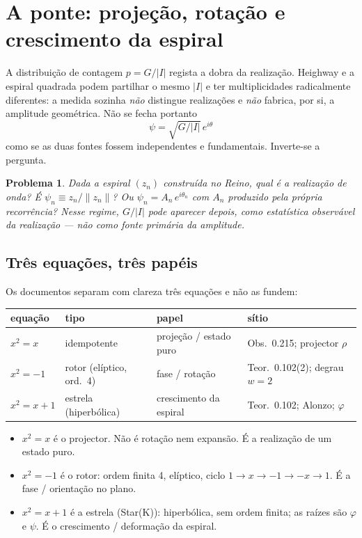 \documentclass[11pt,a4paper]{article}
\newtheorem{problema}[teorema]{Problema}
\begin{document}
\section{A ponte: projeção, rotação e crescimento da espiral}
\label{sec:ponte}

A distribuição de contagem $p=G/|I|$ regista a dobra da realização.
Heighway e a espiral quadrada podem partilhar o mesmo $|I|$ e ter multiplicidades
radicalmente diferentes: a medida sozinha \emph{não} distingue realizações e
\emph{não} fabrica, por si, a amplitude geométrica.
Não se fecha portanto
\[
\psi=\sqrt{G/|I|}\,e^{i\theta}
\]
como se as duas fontes fossem independentes e fundamentais.
Inverte-se a pergunta.

\begin{problema}
\label{prob:central}
Dada a espiral $(z_n)$ construída no Reino, qual é a realização de onda?
É $\psi_n\equiv z_n/\|z_n\|$?
Ou $\psi_n=A_n\,e^{i\theta_n}$ com $A_n$ produzido pela própria recorrência?
Nesse regime, $G/|I|$ pode aparecer \emph{depois}, como estatística observável
da realização --- não como fonte primária da amplitude.
\end{problema}

\subsection{Três equações, três papéis}

Os documentos separam com clareza três equações e não as fundem:

\begin{center}
\renewcommand{\arraystretch}{1.25}
\begin{tabular}{@{}llll@{}}
\toprule
equação & tipo & papel & sítio \\
\midrule
$x^2=x$ & idempotente & projeção / estado puro & Obs.~0.215; projector $\rho$ \\
$x^2=-1$ & rotor (elíptico, ord.~4) & fase / rotação & Teor.~0.102(2); degrau $w=2$ \\
$x^2=x+1$ & estrela (hiperbólica) & crescimento da espiral & Teor.~0.102; Alonzo; $\varphi$ \\
\bottomrule
\end{tabular}
\end{center}

\begin{itemize}[leftmargin=1.3em,itemsep=2pt]
  \item $x^2=x$ é o projector. Não é rotação nem expansão. É a realização de um estado puro.
  \item $x^2=-1$ é o rotor: ordem finita 4, elíptico, ciclo
        $1\to x\to-1\to-x\to1$. É a fase / orientação no plano.
  \item $x^2=x+1$ é a estrela (Star(K)): hiperbólica, sem ordem finita; as raízes são
        $\varphi$ e $\psi$. É o crescimento / deformação da espiral.
\end{itemize}
\end{document}
